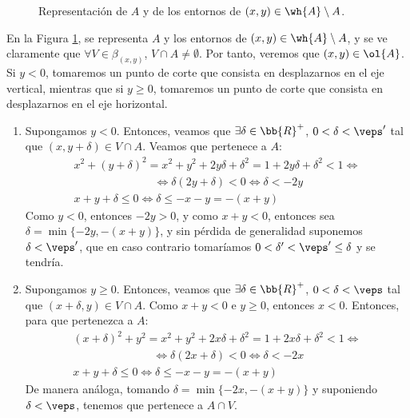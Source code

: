 \documentclass[12pt]{article}
\begin{document}
\begin{ejercicio}
\begin{enumerate}
\begin{description}
\begin{figure}[H]
\begin{tikzpicture}[scale=1.4]
                    \end{tikzpicture}
                    \caption{Representación de $A$ y de los entornos de $(x,y)\in \wh{A}\setminus A$.}
                    \label{fig:Ej2CierreA}
                \end{figure}
                En la Figura \ref{fig:Ej2CierreA}, se representa $A$ y los entornos de $(x,y)\in \wh{A}\setminus A$, y se ve claramente que
                $\forall V\in \beta_{(x,y)}$, $V\cap A\neq \emptyset$. Por tanto, veremos que $(x,y)\in \ol{A}$. Si $y< 0$, tomaremos un punto de corte
                que consista en desplazarnos en el eje vertical, mientras que si $y\geq 0$, tomaremos un punto de corte que consista en desplazarnos en el eje horizontal.
                \begin{enumerate}
                    \item Supongamos $y<0$. Entonces, veamos que $\exists \delta \in \bb{R}^+$, $0<\delta<\veps'$ tal que $\left(x, y+\delta\right)\in V\cap A$.
                    Veamos que pertenece a $A$:
                    \begin{gather*}
                        x^2 + \left(y+\delta\right)^2 = x^2 + y^2 + 2y\delta + \delta^2 = 1 + 2y\delta + \delta^2 < 1 \Longleftrightarrow \\
                        \hspace{3cm}\Longleftrightarrow \delta(2y+\delta) < 0 \Longleftrightarrow \delta < -2y \\
                        x + y + \delta \leq 0 \Longleftrightarrow \delta \leq -x-y = -(x+y)
                    \end{gather*}
                    Como $y<0$, entonces $-2y>0$, y como $x+y<0$, entonces sea $\delta=\min\{-2y, -(x+y)\}$, y sin pérdida de generalidad suponemos $\delta < \veps'$, que en caso contrario tomaríamos $0<\delta'<\veps'\leq \delta$ y se tendría.

                    \item Supongamos $y\geq 0$. Entonces, veamos que $\exists \delta \in \bb{R}^+$, $0<\delta<\veps$ tal que $\left(x+\delta, y\right)\in V\cap A$.
                    Como $x+y<0$ e $y\geq 0$, entonces $x<0$. Entonces, para que pertenezca a $A$:
                    \begin{gather*}
                        \left(x+\delta\right)^2 + y^2  = x^2 + y^2 + 2x\delta + \delta^2 = 1 + 2x\delta + \delta^2 < 1 \Longleftrightarrow \\
                        \hspace{3cm}\Longleftrightarrow \delta(2x+\delta) < 0 \Longleftrightarrow \delta < -2x \\
                        x + y + \delta \leq 0 \Longleftrightarrow \delta \leq -x-y = -(x+y)
                    \end{gather*}
                    De manera análoga, tomando $\delta=\min\{-2x, -(x+y)\}$ y suponiendo $\delta<\veps$, tenemos que pertenece a $A\cap V$.
                \end{enumerate}


\end{description}
\end{enumerate}
\end{ejercicio}
\end{document}
